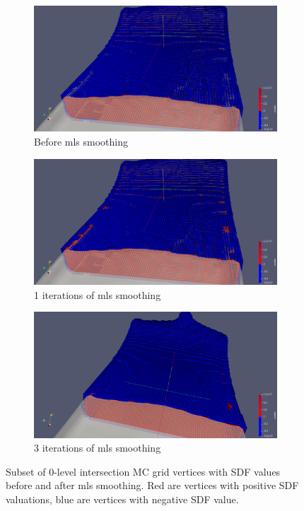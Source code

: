 \begin{figure}[H]
	\begin{center}
		\begin{subfigure}[b]{0.9\textwidth}
			\includegraphics[width=\textwidth]{figures/IntersectionCellsSdfBeforeMls_1_iter.png}	
			\caption{Before mls smoothing} \label{fig:mls_0_iter}
		\end{subfigure}
		\begin{subfigure}[b]{0.9\textwidth}
			\includegraphics[width=\textwidth]{ figures/IntersectionCellsSdfAfterMls_1_iter.png}	
			\caption{1 iterations of mls smoothing} \label{fig:mls_1_iter}
		\end{subfigure}
		\begin{subfigure}[b]{0.9\textwidth}
			\includegraphics[width=\textwidth]{figures/IntersectionCellsSdfAfterMls_3_iter.png}	
			\caption{3 iterations of mls smoothing} \label{fig:mls_3_iter}
		\end{subfigure}
	\end{center}
	\caption{Subset of 0-level intersection MC grid vertices with SDF values before and after mls smoothing. Red are vertices with positive SDF valuations, blue are vertices with negative SDF value.} 
	\label{fig:mls_iterations}
\end{figure}
